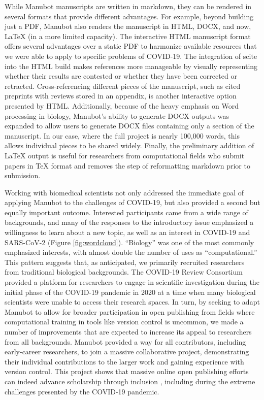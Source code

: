 \documentclass[twocolumn]{ceurart}
\begin{document}
While Manubot manuscripts are written in markdown, they can be rendered in several formats that provide different advantages.
For example, beyond building just a PDF, Manubot also renders the manuscript in HTML, DOCX, and now, LaTeX (in a more limited capacity).
The interactive HTML manuscript format offers several advantages over a static PDF to harmonize available resources that we were able to apply to specific problems of COVID-19.
The integration of scite into the HTML build makes references more manageable by visually representing whether their results are contested or whether they have been corrected or retracted.
Cross-referencing different pieces of the manuscript, such as cited preprints with reviews stored in an appendix, is another interactive option presented by HTML.
Additionally, because of the heavy emphasis on Word processing in biology, Manubot's ability to generate DOCX outputs was expanded to allow users to generate DOCX files containing only a section of the manuscript.
In our case, where the full project is nearly 100,000 words, this allows individual pieces to be shared widely.
Finally, the preliminary addition of LaTeX output is useful for researchers from computational fields who submit papers in TeX format and removes the step of reformatting markdown prior to submission.

Working with biomedical scientists not only addressed the immediate goal of applying Manubot to the challenges of COVID-19, but also provided a second but equally important outcome.
Interested participants came from a wide range of backgrounds, and many of the responses to the introductory issue emphasized a willingness to learn about a new topic, as well as an interest in COVID-19 and SARS-CoV-2 (Figure \ref{fig:wordcloud}).
``Biology'' was one of the most commonly emphasized interests, with almost double the number of uses as ``computational.''
This pattern suggests that, as anticipated, we primarily recruited researchers from traditional biological backgrounds.
The COVID-19 Review Consortium provided a platform for researchers to engage in scientific investigation during the initial phase of the COVID-19 pandemic in 2020 at a time when many biological scientists were unable to access their research spaces.
In turn, by seeking to adapt Manubot to allow for broader participation in open publishing from fields where computational training in tools like version control is uncommon, we made a number of improvements that are expected to increase its appeal to researchers from all backgrounds.
Manubot provided a way for all contributors, including early-career researchers, to join a massive collaborative project, demonstrating their individual contributions to the larger work and gaining experience with version control.
This project shows that massive online open publishing efforts can indeed advance scholarship through inclusion \citep{PoDz2q0A}, including during the extreme challenges presented by the COVID-19 pandemic.
\end{document}
